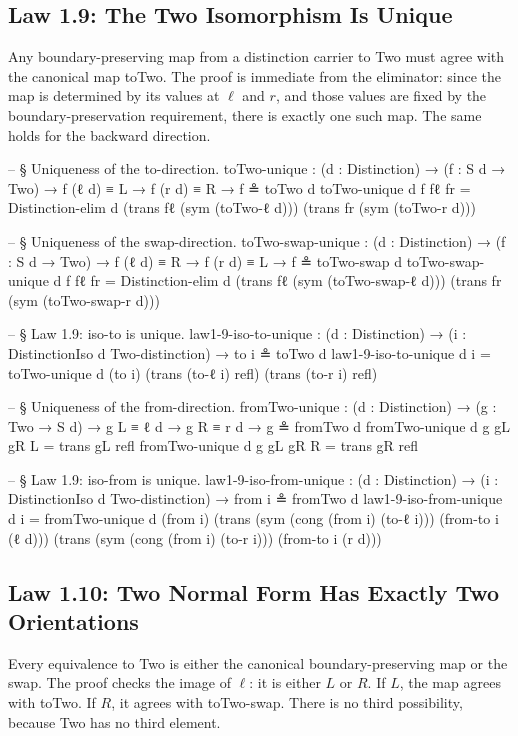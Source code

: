 \documentclass[11pt,a4paper]{book}
\def\texttt#1{#1}%
\begin{document}
\subsection{Law 1.9: The Two Isomorphism Is Unique}

Any boundary-preserving map from a distinction carrier to \texttt{Two} must agree with the canonical map \texttt{toTwo}. The proof is immediate from the eliminator: since the map is determined by its values at $\ell$ and $r$, and those values are fixed by the boundary-preservation requirement, there is exactly one such map. The same holds for the backward direction.

\begin{code}
-- § Uniqueness of the to-direction.
toTwo-unique :
  (d : Distinction) →
  (f : S d → Two) →
  f (ℓ d) ≡ L →
  f (r d) ≡ R →
  f ≗ toTwo d
toTwo-unique d f fℓ fr =
  Distinction-elim d
    (trans fℓ (sym (toTwo-ℓ d)))
    (trans fr (sym (toTwo-r d)))

-- § Uniqueness of the swap-direction.
toTwo-swap-unique :
  (d : Distinction) →
  (f : S d → Two) →
  f (ℓ d) ≡ R →
  f (r d) ≡ L →
  f ≗ toTwo-swap d
toTwo-swap-unique d f fℓ fr =
  Distinction-elim d
    (trans fℓ (sym (toTwo-swap-ℓ d)))
    (trans fr (sym (toTwo-swap-r d)))

-- § Law 1.9: iso-to is unique.
law1-9-iso-to-unique : (d : Distinction) → (i : DistinctionIso d Two-distinction) → to i ≗ toTwo d
law1-9-iso-to-unique d i =
  toTwo-unique d (to i)
    (trans (to-ℓ i) refl)
    (trans (to-r i) refl)

-- § Uniqueness of the from-direction.
fromTwo-unique :
  (d : Distinction) →
  (g : Two → S d) →
  g L ≡ ℓ d →
  g R ≡ r d →
  g ≗ fromTwo d
fromTwo-unique d g gL gR L = trans gL refl
fromTwo-unique d g gL gR R = trans gR refl

-- § Law 1.9: iso-from is unique.
law1-9-iso-from-unique : (d : Distinction) → (i : DistinctionIso d Two-distinction) → from i ≗ fromTwo d
law1-9-iso-from-unique d i =
  fromTwo-unique d (from i)
    (trans (sym (cong (from i) (to-ℓ i))) (from-to i (ℓ d)))
    (trans (sym (cong (from i) (to-r i))) (from-to i (r d)))
\end{code}

\subsection{Law 1.10: Two Normal Form Has Exactly Two Orientations}

Every equivalence to \texttt{Two} is either the canonical boundary-preserving map or the swap. The proof checks the image of $\ell$: it is either $L$ or $R$. If $L$, the map agrees with \texttt{toTwo}. If $R$, it agrees with \texttt{toTwo-swap}. There is no third possibility, because \texttt{Two} has no third element.
\end{document}
